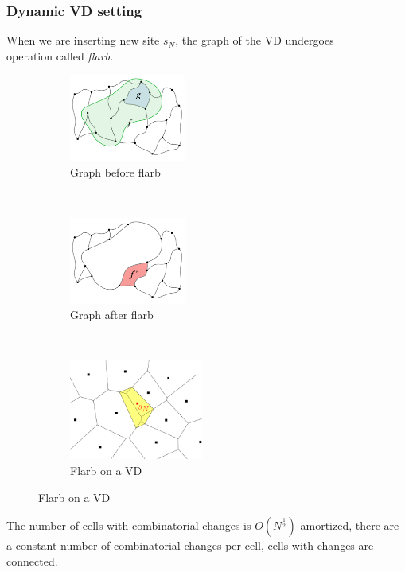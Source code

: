 \begin{frame} \frametitle{Dynamic VD setting}
When we are inserting new site $s_N$, the graph of the VD undergoes \\
operation called {\it flarb.} \vspace{-4mm}

\begin{figure}[h]
\centering
	\begin{subfigure}[t]{0.28\textwidth}
	\centering
	\includegraphics[width=3.8cm]{flarb/2flarb}
	\caption{Graph before flarb}
	\label{fig:flarb}
	\end{subfigure}
~
	\begin{subfigure}[t]{0.28\textwidth}
	\centering
	\includegraphics[width=3.8cm]{flarb/3afterflarb}
	\caption{Graph after flarb}
	\label{fig:afterflarb}
	\end{subfigure}
~
	\begin{subfigure}[t]{0.37\textwidth}
	\centering
	\includegraphics[width=4.4cm]{figs/identFlarb}
	\caption{Flarb on a VD}
	\label{fig:afterflarb}
	\end{subfigure}
\label{fig:exflarb}
\end{figure} \vspace{-2mm}

\begin{theorem}
\label{thm:amorCost} \small
	The number of cells with combinatorial changes is $O(N^{\frac12})$ amortized, there are a constant number of combinatorial changes per cell, cells with changes are connected.
\end{theorem} \end{frame}


